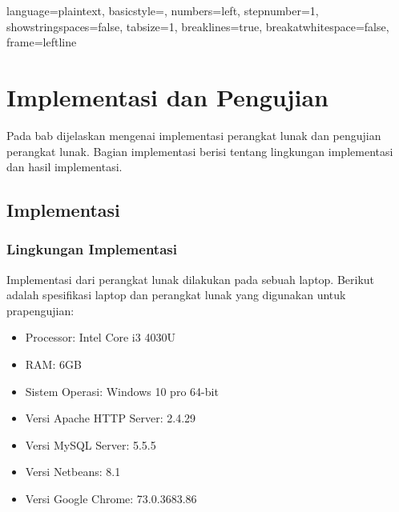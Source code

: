 
\lstset
{ 
    language=plaintext,
    basicstyle=\footnotesize,
    numbers=left,
    stepnumber=1,
    showstringspaces=false,
    tabsize=1,
    breaklines=true,
    breakatwhitespace=false,
    frame=leftline
}

\chapter{Implementasi dan Pengujian}
\label{chap:implementasidanpengujian}
Pada bab dijelaskan mengenai implementasi perangkat lunak dan pengujian perangkat lunak. Bagian implementasi berisi tentang lingkungan implementasi dan hasil implementasi.  

\section{Implementasi}
\label{sec:implementasi}
\subsection{Lingkungan Implementasi}
\label{subsec:lingkunganimplementasi}
Implementasi dari perangkat lunak dilakukan pada sebuah laptop. Berikut adalah spesifikasi laptop dan perangkat lunak yang digunakan untuk prapengujian:
\begin{itemize}
\item Processor: Intel Core i3 4030U
\item RAM: 6GB
\item Sistem Operasi: Windows 10 pro 64-bit
\item Versi Apache HTTP Server: 2.4.29
\item Versi MySQL Server: 5.5.5
\item Versi Netbeans: 8.1
\item Versi Google Chrome: 73.0.3683.86
\end{itemize}

